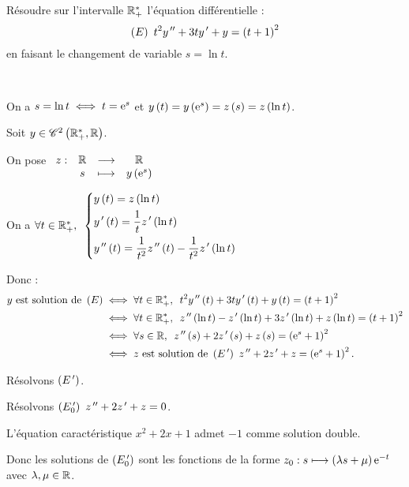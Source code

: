 \begin{corr}
\end{corr}

\begin{exo}[Exercice 10]
Résoudre sur l'intervalle \(\mathbb{R}_+^*\) l'équation différentielle : \[\left(E\right)~t^2y^{\,\prime\prime}+3ty^{\,\prime}+y=\left(t+1\right)^2\] en faisant le changement de variable \(s=\ln t\).
\end{exo}

\begin{corr}~\\
\begin{brouill}
On a \(s=\ln t\iff t=\mathrm{e}^{s}\) et \(y\left(t\right)=y\left(\mathrm{e}^{s}\right)=z\left(s\right)=z\left(\ln t\right)\).
\end{brouill}

Soit \(y\in\mathscr{C}^{2}\left(\mathbb{R}_+^*,\mathbb{R}\right)\).

On pose \(\begin{array}[t]{cccc}z : & \mathbb{R} & \longrightarrow & \mathbb{R} \\ & s & \longmapsto & y\left(\mathrm{e}^{s}\right)\end{array}\)

On a \(\quantifs{\forall t\in\Rps}\begin{dcases}
y\paren{t}=z\paren{\ln t} \\
y\prim\paren{t}=\dfrac{1}{t}z\prim\paren{\ln t} \\
y\seconde\paren{t}=\dfrac{1}{t^2}z\seconde\paren{t}-\dfrac{1}{t^2}z\prim\paren{\ln t}
\end{dcases}\)

Donc : \[\begin{aligned}
y\text{ est solution de }\paren{E}&\ssi\quantifs{\forall t\in\Rps}t^2y\seconde\paren{t}+3ty\prim\paren{t}+y\paren{t}=\paren{t+1}^2 \\
&\ssi\quantifs{\forall t\in\Rps}z\seconde\paren{\ln t}-z\prim\paren{\ln t}+3z\prim\paren{\ln t}+z\paren{\ln t}=\paren{t+1}^2 \\
&\ssi\quantifs{\forall s\in\R}z\seconde\paren{s}+2z\prim\paren{s}+z\paren{s}=\paren{\e{s}+1}^2 \\
&\ssi z\text{ est solution de }\paren{E\prim}~z\seconde+2z\prim+z=\paren{\e{s}+1}^2.
\end{aligned}\]

Résolvons \(\left(E^{\,\prime}\right)\).

Résolvons \(\left(E_0^{\,\prime}\right)~z^{\,\prime\prime}+2z^{\,\prime}+z=0\).

L'équation caractéristique \(x^2+2x+1\) admet \(-1\) comme solution double.

Donc les solutions de \(\left(E_0^{\,\prime}\right)\) sont les fonctions de la forme \(z_0:s\longmapsto\left(\lambda s+\mu\right)\mathrm{e}^{-t}\) avec \(\lambda,\mu\in\mathbb{R}\).


\end{corr}
